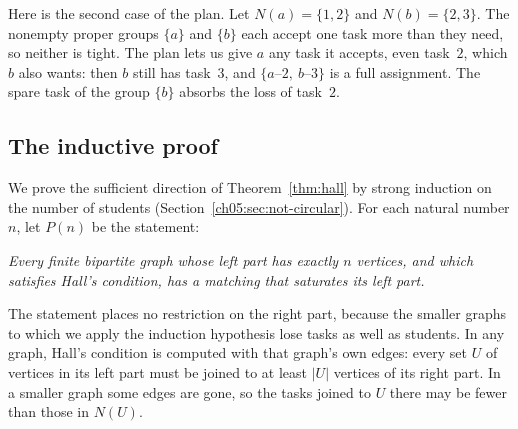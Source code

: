 Here is the second case of the plan. Let $N(a)=\{1,2\}$ and $N(b)=\{2,3\}$. The nonempty proper groups $\{a\}$ and $\{b\}$ each accept one task more than they need, so neither is tight. The plan lets us give $a$ any task it accepts, even task~$2$, which $b$ also wants: then $b$ still has task~$3$, and $\{a\text{--}2,\ b\text{--}3\}$ is a full assignment. The spare task of the group $\{b\}$ absorbs the loss of task~$2$.

\subsection*{The inductive proof}
We prove the sufficient direction of Theorem~\ref{thm:hall} by strong induction on the number of students (Section~\ref{ch05:sec:not-circular}). For each natural number $n$, let $P(n)$ be the statement:
\begin{center}
\begin{minipage}{0.88\linewidth}
\emph{Every finite bipartite graph whose left part has exactly $n$ vertices, and which satisfies Hall's condition, has a matching that saturates its left part.}
\end{minipage}
\end{center}
The statement places no restriction on the right part, because the smaller graphs to which we apply the induction hypothesis lose tasks as well as students. In any graph, Hall's condition is computed with that graph's own edges: every set $U$ of vertices in its left part must be joined to at least $|U|$ vertices of its right part. In a smaller graph some edges are gone, so the tasks joined to $U$ there may be fewer than those in $N(U)$.

